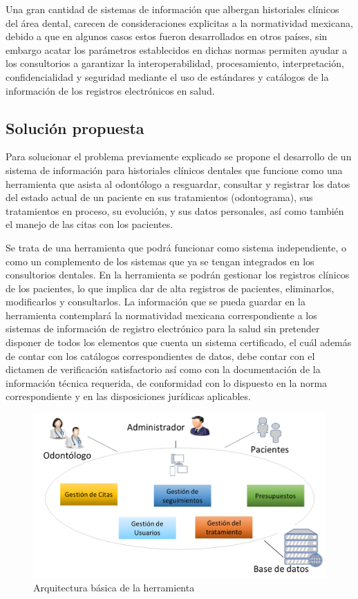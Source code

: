 \vspace{1em}

Una gran cantidad de sistemas de información que albergan historiales clínicos del área dental, carecen de consideraciones explicitas a la normatividad mexicana, debido a que en algunos casos estos fueron desarrollados en otros países, sin embargo acatar los parámetros establecidos en dichas normas permiten ayudar a los consultorios a garantizar la interoperabilidad, procesamiento, interpretación, confidencialidad y seguridad mediante el uso de estándares y catálogos de la información de los registros electrónicos en salud.

\subsection{Solución propuesta}

Para solucionar el problema previamente explicado se propone el desarrollo de un sistema de información para historiales clínicos dentales que funcione como una herramienta que asista al odontólogo a resguardar, consultar y registrar los datos del estado actual de un paciente en sus tratamientos (odontograma), sus tratamientos en proceso, su evolución, y sus datos personales, así como también el manejo de las citas con los pacientes.

\vspace{1em}

Se trata de una herramienta que podrá funcionar como sistema independiente, o como un complemento de los sistemas que ya se tengan integrados en los consultorios dentales. En la herramienta se podrán gestionar los registros clínicos de los pacientes, lo que implica dar de alta registros de pacientes, eliminarlos, modificarlos y consultarlos. La información que se pueda guardar en la herramienta contemplará la normatividad mexicana correspondiente a los sistemas de información de registro electrónico para la salud sin pretender disponer de todos los elementos que cuenta un sistema certificado, el cuál además de contar con los catálogos correspondientes de datos, debe contar con el dictamen de verificación satisfactorio así como con la documentación de la información técnica requerida, de conformidad con lo dispuesto en la norma correspondiente y en las disposiciones jurídicas aplicables.

\begin{figure}[H]
\centering
\includegraphics[width=12cm, keepaspectratio]{pictures/diagrama-protocolo.png}
\caption{Arquitectura básica de la herramienta}
\end{figure}

